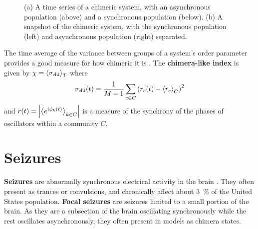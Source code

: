 \documentclass{beamer}
\newcommand{\chimera}{\chi}
\newcommand{\ordparam}{r}
\newcommand{\phase}{\phi}
\begin{document}
\begin{frame}[t]
\begin{multicols}{3}
\begin{figure}
\begin{subfigure}{0.33\columnwidth}
        \caption{}
        \label{fig:abrams_snapshot}
      \end{subfigure}%
      \caption{(a) A time series of a chimeric system, with an asynchronous population (above) and a synchronous population (below).
        (b) A snapshot of the chimeric system, with the synchronous population (left) and asynchronous population (right) separated.
      }
      \label{fig:abrams}
    \end{figure}
    The time average of the variance between groups of a system's order parameter provides a good measure for how chimeric it is \cite{Shanahan2010}.
    The \textbf{chimera-like index} is given by $\chimera = \expval{\sigma_{\text{chi}}}_{T}$
    where
    \begin{equation}
      \label{eq:chimera}
      \sigma_{\text{chi}}(t)
      =
      \frac{1}{M - 1} \sum_{c \in C}{\pqty{\ordparam_{c}(t) - \expval{\ordparam_{c}}_{C}}}^{2}
    \end{equation}
    and $\ordparam(t) = \abs{\expval{e^{i \phase_{k}(t)}}_{k \in C}}$ is a measure of the synchrony of the phases of oscillators within a community $C$.

    \section{Seizures}
    \textbf{Seizures} are abnormally synchronous electrical activity in the brain \cite{Kandel2013}.
    They often present as trances or convulsions, and chronically affect about \SI{3}{\percent} of the United States population.
    \textbf{Focal seizures} are seizures limited to a small portion of the brain.
    As they are a subsection of the brain oscillating synchronously while the rest oscillates asynchronously, they often present in models as chimera states.


\end{multicols}
\end{frame}
\end{document}

